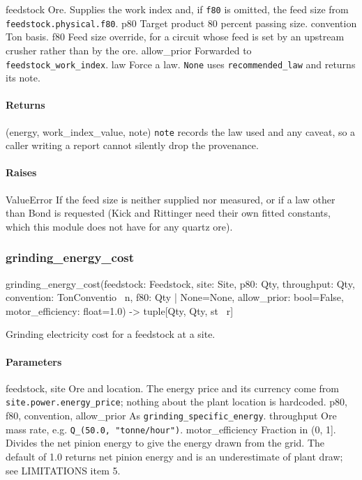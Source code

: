 \documentclass[10pt,a4paper,twoside]{report}
\begin{document}
feedstock Ore. Supplies the work index and, if \texttt{f80} is omitted, the feed size from \texttt{feedstock.physical.f80}. p80 Target product 80 percent passing size. convention Ton basis. f80 Feed size override, for a circuit whose feed is set by an upstream crusher rather than by the ore. allow\_prior Forwarded to \texttt{feedstock\_work\_index}. law Force a law. \texttt{None} uses \texttt{recommended\_law} and returns its note.

\paragraph*{Returns}

(energy, work\_index\_value, note) \texttt{note} records the law used and any caveat, so a caller writing a report cannot silently drop the provenance.

\paragraph*{Raises}

ValueError If the feed size is neither supplied nor measured, or if a law other than Bond is requested (Kick and Rittinger need their own fitted constants, which this module does not have for any quartz ore).

\subsubsection*{grinding\_energy\_cost}

\begin{verbatimsmall}
grinding_energy_cost(feedstock: Feedstock, site: Site, p80: Qty, throughput: Qty, convention: TonConventio
    \ n, f80: Qty | None=None, allow_prior: bool=False, motor_efficiency: float=1.0) -> tuple[Qty, Qty, st
    \ r]
\end{verbatimsmall}

Grinding electricity cost for a feedstock at a site.

\paragraph*{Parameters}

feedstock, site Ore and location. The energy price and its currency come from \texttt{site.power.energy\_price}; nothing about the plant location is hardcoded. p80, f80, convention, allow\_prior As \texttt{grinding\_specific\_energy}. throughput Ore mass rate, e.g. \texttt{Q\_(50.0, "tonne/hour")}. motor\_efficiency Fraction in (0, 1]. Divides the net pinion energy to give the energy drawn from the grid. The default of 1.0 returns net pinion energy and is an underestimate of plant draw; see LIMITATIONS item 5.
\end{document}
